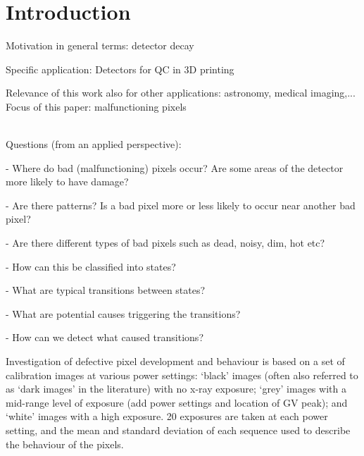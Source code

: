 \documentclass[../../IO-Pixels.tex]{subfiles}
\begin{document}
\section{Introduction}

\begin{outline}
Motivation in general terms: detector decay

Specific application: Detectors for QC in 3D printing 

Relevance of this work also for other applications: astronomy, medical imaging,...
\\

Focus of this paper: malfunctioning pixels

\\
Questions (from an applied perspective):

- Where do bad (malfunctioning) pixels occur? Are some areas of the detector more likely to have damage?

- Are there patterns? Is a bad pixel more or less likely to occur near another bad pixel?

- Are there different types of bad pixels such as dead, noisy, dim, hot etc?

- How can this be classified into states?

- What are typical transitions between states? 

- What are potential causes triggering the transitions? 

- How can we detect what caused transitions?
\end{outline}


Investigation of defective pixel development and behaviour is based on a set of calibration images at various power settings: `black' images (often also referred to as `dark images' in the literature) with no x-ray exposure; `grey' images with a mid-range level of exposure (add power settings and location of GV peak); and `white' images with a high exposure. 20 exposures are taken at each power setting, and the mean and standard deviation of each sequence used to describe the behaviour of the pixels. 
\end{document}
